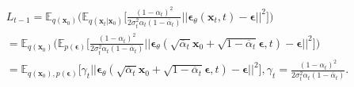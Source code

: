 \documentclass[10pt]{article}
\begin{document}
\begin{gather}
      L_{t-1} =   \mathbb{E}_{q(\textbf{x}_{0})}\Big(  \mathbb{E}_{q(\textbf{x}_{t}|\textbf{x}_{0} )} \Big[
      \frac{(1-\alpha_t)^2}{2\sigma^2_t \alpha_t (1-\overline{\alpha}_t)}
       ||\bm{\epsilon}_{\theta}(\textbf{x}_{t}, t) - \bm{\epsilon} ||^2
      \Big] \Big) \\
      = \mathbb{E}_{q(\textbf{x}_{0})}\Big(  \mathbb{E}_{p(\bm{\epsilon})} \Big[
      \frac{(1-\alpha_t)^2}{2\sigma^2_t \alpha_t (1-\overline{\alpha}_t)}
       ||\bm{\epsilon}_{\theta}(\sqrt{\overline{\alpha}_t}\textbf{x}_{0} + \sqrt{1 - \overline{\alpha}_t}\bm{\epsilon}, t) - \bm{\epsilon} ||^2
      \Big] \Big) \\
      = \mathbb{E}_{q(\textbf{x}_{0}), p(\bm{\epsilon})}\Big[
      \gamma_t ||\bm{\epsilon}_{\theta}(\sqrt{\overline{\alpha}_t}\textbf{x}_{0} + \sqrt{1 - \overline{\alpha}_t}\bm{\epsilon}, t) - \bm{\epsilon} ||^2
      \Big], \gamma_t = \frac{(1-\alpha_t)^2}{2\sigma^2_t \alpha_t (1-\overline{\alpha}_t)}.
\end{gather}
\end{document}
